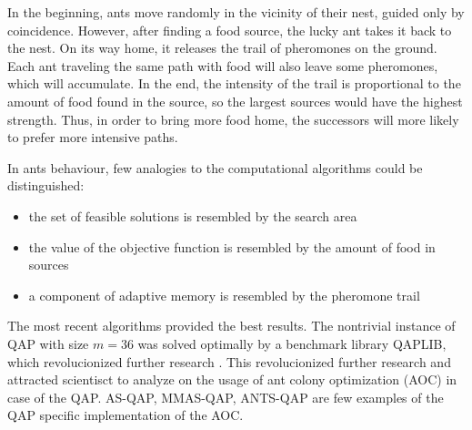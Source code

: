 In the beginning, ants move randomly in the vicinity of their nest, guided only by coincidence.
However, after finding a food source, the lucky ant takes it back to the nest.
On its way home, it releases the trail of pheromones on the ground.
Each ant traveling the same path with food will also leave some pheromones, which will accumulate.
In the end, the intensity of the trail is proportional to the amount of food found in the source, so the largest sources would have the highest strength.
Thus, in order to bring more food home, the successors will more likely to prefer more intensive paths.

In ants behaviour, few analogies to the computational algorithms could be distinguished:
\begin{itemize}
  \item the set of feasible solutions is resembled by the search area
  \item the value of the objective function is resembled by the amount of food in sources
  \item a component of adaptive memory is resembled by the pheromone trail
\end{itemize}

The most recent algorithms provided the best results.
The nontrivial instance of QAP with size $ m = 36 $ was solved optimally by a benchmark library QAPLIB, which revolucionized further research \cite{dorigo2004ant}.
This revolucionized further research and attracted scientisct to analyze on the usage of ant colony optimization (AOC) in case of the QAP.
AS-QAP, MMAS-QAP, ANTS-QAP are few examples of the QAP specific implementation of the AOC.

